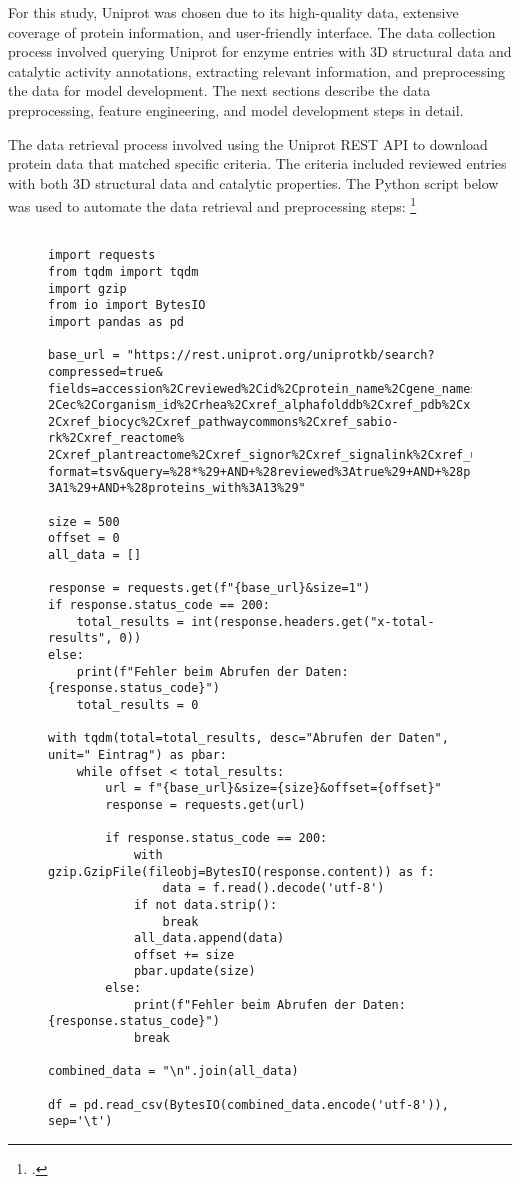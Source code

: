 For this study, Uniprot was chosen due to its high-quality data, extensive coverage of protein information, and user-friendly interface. The data collection process involved querying Uniprot for enzyme entries with 3D structural data and catalytic activity annotations, extracting relevant information, and preprocessing the data for model development. The next sections describe the data preprocessing, feature engineering, and model development steps in detail.

The data retrieval process involved using the Uniprot REST API to download protein data that matched specific criteria. The criteria included reviewed entries with both 3D structural data and catalytic properties. The Python script below was used to automate the data retrieval and preprocessing steps:  \footcite{polleyTobiasPolDeepZyme2024}

\begin{figure}[bht]
\begin{lstlisting}[caption=Python script for data retrieval and preprocessing from Uniprot, label=lst:uniprot_data_retrieval]

import requests
from tqdm import tqdm
import gzip
from io import BytesIO
import pandas as pd

base_url = "https://rest.uniprot.org/uniprotkb/search?compressed=true&
fields=accession%2Creviewed%2Cid%2Cprotein_name%2Cgene_names%2Corganism_name%
2Cec%2Corganism_id%2Crhea%2Cxref_alphafolddb%2Cxref_pdb%2Cxref_brenda%
2Cxref_biocyc%2Cxref_pathwaycommons%2Cxref_sabio-rk%2Cxref_reactome%
2Cxref_plantreactome%2Cxref_signor%2Cxref_signalink%2Cxref_unipathway&
format=tsv&query=%28*%29+AND+%28reviewed%3Atrue%29+AND+%28proteins_with%
3A1%29+AND+%28proteins_with%3A13%29"

size = 500
offset = 0
all_data = []

response = requests.get(f"{base_url}&size=1")
if response.status_code == 200:
    total_results = int(response.headers.get("x-total-results", 0))
else:
    print(f"Fehler beim Abrufen der Daten: {response.status_code}")
    total_results = 0

with tqdm(total=total_results, desc="Abrufen der Daten", unit=" Eintrag") as pbar:
    while offset < total_results:
        url = f"{base_url}&size={size}&offset={offset}"
        response = requests.get(url)
        
        if response.status_code == 200:
            with gzip.GzipFile(fileobj=BytesIO(response.content)) as f:
                data = f.read().decode('utf-8')
            if not data.strip():
                break
            all_data.append(data)
            offset += size
            pbar.update(size)
        else:
            print(f"Fehler beim Abrufen der Daten: {response.status_code}")
            break

combined_data = "\n".join(all_data)

df = pd.read_csv(BytesIO(combined_data.encode('utf-8')), sep='\t')

\end{lstlisting}
\end{figure}


